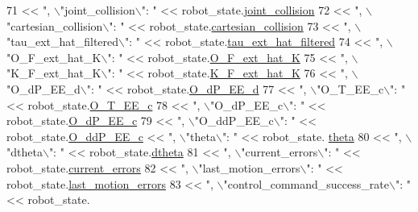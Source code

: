 \begin{DoxyCode}
71           << \textcolor{stringliteral}{", \(\backslash\)"joint\_collision\(\backslash\)": "} << robot\_state.\hyperlink{structfranka_1_1RobotState_a38757bafd4dd8e138410de1dca0c36f8}{joint\_collision}
72           << \textcolor{stringliteral}{", \(\backslash\)"cartesian\_collision\(\backslash\)": "} << robot\_state.\hyperlink{structfranka_1_1RobotState_a52c20478f4c1e162df38582ea9bda044}{cartesian\_collision}
73           << \textcolor{stringliteral}{", \(\backslash\)"tau\_ext\_hat\_filtered\(\backslash\)": "} << robot\_state.\hyperlink{structfranka_1_1RobotState_acdef8005828d193e45b128085a9e363b}{tau\_ext\_hat\_filtered}
74           << \textcolor{stringliteral}{", \(\backslash\)"O\_F\_ext\_hat\_K\(\backslash\)": "} << robot\_state.\hyperlink{structfranka_1_1RobotState_a5a830b4f9d6a3c2dc92e4a9cc6050493}{O\_F\_ext\_hat\_K}
75           << \textcolor{stringliteral}{", \(\backslash\)"K\_F\_ext\_hat\_K\(\backslash\)": "} << robot\_state.\hyperlink{structfranka_1_1RobotState_a96267d443c05fcc58d7ac32f63912649}{K\_F\_ext\_hat\_K}
76           << \textcolor{stringliteral}{", \(\backslash\)"O\_dP\_EE\_d\(\backslash\)": "} << robot\_state.\hyperlink{structfranka_1_1RobotState_a1e0a82b98534929c3061295d5761d607}{O\_dP\_EE\_d}
77           << \textcolor{stringliteral}{", \(\backslash\)"O\_T\_EE\_c\(\backslash\)": "} << robot\_state.\hyperlink{structfranka_1_1RobotState_a395c48eff099419ea5d42eaf0870fc18}{O\_T\_EE\_c}
78           << \textcolor{stringliteral}{", \(\backslash\)"O\_dP\_EE\_c\(\backslash\)": "} << robot\_state.\hyperlink{structfranka_1_1RobotState_a4be112bd1a9a7d777a67aea4a18a8dcc}{O\_dP\_EE\_c}
79           << \textcolor{stringliteral}{", \(\backslash\)"O\_ddP\_EE\_c\(\backslash\)": "} << robot\_state.\hyperlink{structfranka_1_1RobotState_ac8dfcf78ddbb27852484e921d6d66ca1}{O\_ddP\_EE\_c} << \textcolor{stringliteral}{", \(\backslash\)"theta\(\backslash\)": "} << robot\_state.
      \hyperlink{structfranka_1_1RobotState_aa34145d77dd411d7ca578c355f0ba2b4}{theta}
80           << \textcolor{stringliteral}{", \(\backslash\)"dtheta\(\backslash\)": "} << robot\_state.\hyperlink{structfranka_1_1RobotState_a271db0a55dd346715ed8a0daf3f8887c}{dtheta}
81           << \textcolor{stringliteral}{", \(\backslash\)"current\_errors\(\backslash\)": "} << robot\_state.\hyperlink{structfranka_1_1RobotState_abc5515f7a27f5de82396ea792a5ecb48}{current\_errors}
82           << \textcolor{stringliteral}{", \(\backslash\)"last\_motion\_errors\(\backslash\)": "} << robot\_state.\hyperlink{structfranka_1_1RobotState_a06d7019f85339409e932dc086b7a260b}{last\_motion\_errors}
83           << \textcolor{stringliteral}{", \(\backslash\)"control\_command\_success\_rate\(\backslash\)": "} << robot\_state.

\end{DoxyCode}

